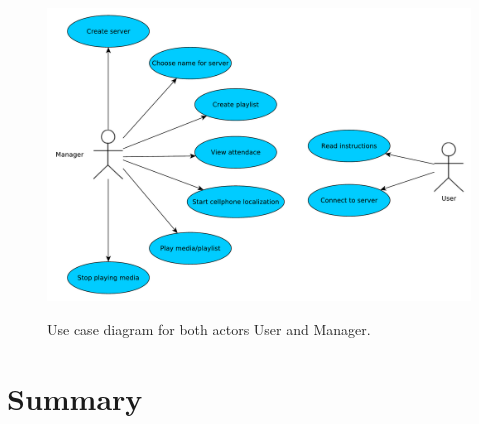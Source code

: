 \begin{figure}[h]
    \begin{center}
    \includegraphics[scale=0.4]{images/usecase.pdf}
    \label{img:usecase}
    \caption{Use case diagram for both actors User and Manager.}
    \end{center}
\end{figure}

%	
%		

\section{Summary}

